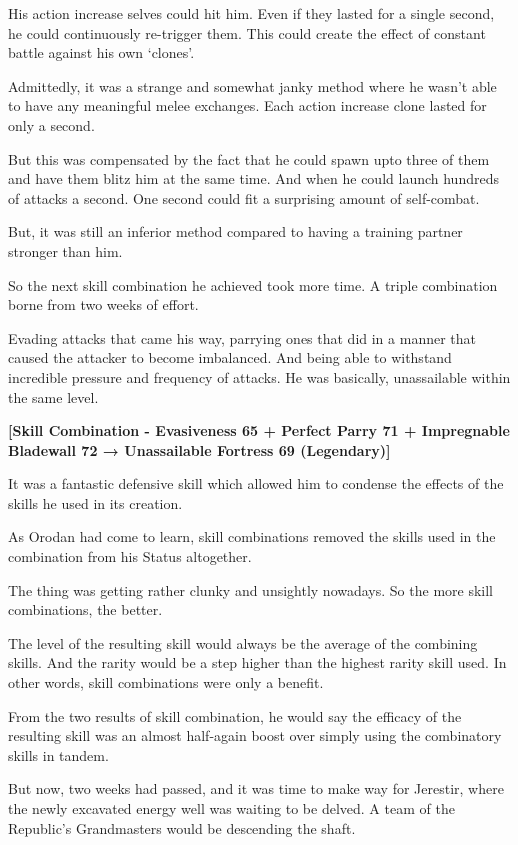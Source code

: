 \documentclass[a4paper,10pt]{book}
\begin{document}
His action increase selves could hit him. Even if they lasted for a single second, he could continuously re-trigger them. This could create the effect of constant battle against his own ‘clones’.\par
Admittedly, it was a strange and somewhat janky method where he wasn’t able to have any meaningful melee exchanges. Each action increase clone lasted for only a second.\par
But this was compensated by the fact that he could spawn upto three of them and have them blitz him at the same time. And when he could launch hundreds of attacks a second. One second could fit a surprising amount of self-combat.\par
But, it was still an inferior method compared to having a training partner stronger than him.\par
So the next skill combination he achieved took more time. A triple combination borne from two weeks of effort.\par
Evading attacks that came his way, parrying ones that did in a manner that caused the attacker to become imbalanced. And being able to withstand incredible pressure and frequency of attacks. He was basically, unassailable within the same level.\par
\textbf{[Skill Combination - Evasiveness 65 + Perfect Parry 71 + Impregnable Bladewall 72 → Unassailable Fortress 69 (Legendary)]}\par
It was a fantastic defensive skill which allowed him to condense the effects of the skills he used in its creation.\par
As Orodan had come to learn, skill combinations removed the skills used in the combination from his Status altogether.\par
The thing was getting rather clunky and unsightly nowadays. So the more skill combinations, the better.\par
The level of the resulting skill would always be the average of the combining skills. And the rarity would be a step higher than the highest rarity skill used. In other words, skill combinations were only a benefit.\par
From the two results of skill combination, he would say the efficacy of the resulting skill was an almost half-again boost over simply using the combinatory skills in tandem.\par
But now, two weeks had passed, and it was time to make way for Jerestir, where the newly excavated energy well was waiting to be delved. A team of the Republic’s Grandmasters would be descending the shaft.\par
\end{document}

